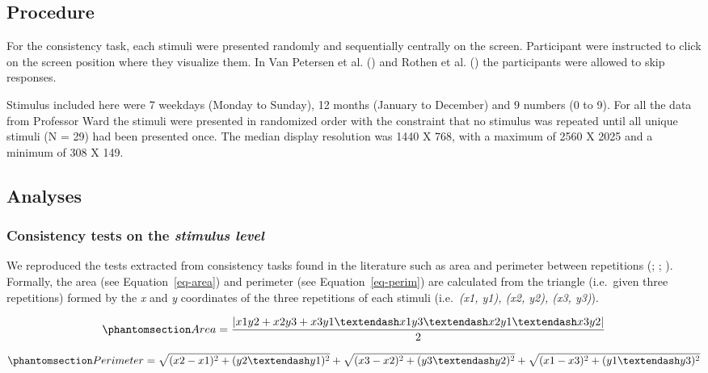\documentclass[
  man,
  longtable,
  a4paper,
  nolmodern,
  notxfonts,
  notimes,
  colorlinks=true,linkcolor=blue,citecolor=blue,urlcolor=blue]{apa7}
\begin{document}
\subsection{Procedure}\label{procedure}

For the consistency task, each stimuli were presented randomly and
sequentially centrally on the screen. Participant were instructed to
click on the screen position where they visualize them. In Van Petersen
et al. () and Rothen et al.
() the participants were allowed to skip
responses.

Stimulus included here were 7 weekdays (Monday to Sunday), 12 months
(January to December) and 9 numbers (0 to 9). For all the data from
Professor Ward the stimuli were presented in randomized order with the
constraint that no stimulus was repeated until all unique stimuli (N =
29) had been presented once. The median display resolution was 1440 X
768, with a maximum of 2560 X 2025 and a minimum of 308 X 149.

\subsection{Analyses}\label{analyses}

\subsubsection{\texorpdfstring{Consistency tests on the \emph{stimulus
level}}{Consistency tests on the stimulus level}}\label{consistency-tests-on-the-stimulus-level}

We reproduced the tests extracted from consistency tasks found in the
literature such as area and perimeter between repetitions
(;
;
). Formally, the area (see
Equation~\ref{eq-area}) and perimeter (see Equation~\ref{eq-perim}) are
calculated from the triangle (i.e.~given three repetitions) formed by
the \emph{x} and \emph{y} coordinates of the three repetitions of each
stimuli (i.e.~\emph{(x1, y1), (x2, y2), (x3, y3)}).

\begin{equation}\phantomsection\label{eq-area}{
Area = \frac{|x1y2 +x2y3 + x3y1 – x1y3 – x2y1 – x3y2|}{2}
}\end{equation}

\begin{equation}\phantomsection\label{eq-perim}{
Perimeter = \sqrt{(x2 - x1)^2 + (y2 – y1)^2} + \sqrt{(x3 - x2)^2 + (y3 –y2)^2} + \sqrt{(x1 - x3)^2 + (y1 – y3)^2}
}\end{equation}
\end{document}
